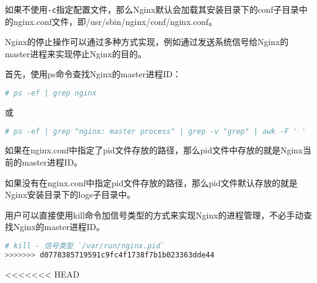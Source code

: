 如果不使用\texttt{-c}指定配置文件，那么Nginx默认会加载其安装目录下的conf子目录中的nginx.conf文件，即/usr/sbin/nginx/conf/nginx.conf。

Nginx的停止操作可以通过多种方式实现，例如通过发送系统信号给Nginx的master进程来实现停止Nginx的目的。

首先，使用ps命令查找Nginx的master进程ID：

\begin{lstlisting}[language=bash]
# ps -ef | grep nginx 
\end{lstlisting}

或


\begin{lstlisting}[language=bash]
# ps -ef | grep "nginx: master process" | grep -v "grep" | awk -F ' ' '{print $2}'
\end{lstlisting}



\begin{compactitem}
\item 如果在nginx.conf中指定了pid文件存放的路径，那么pid文件中存放的就是Nginx当前的master进程ID。

\item 如果没有在nginx.conf中指定pid文件存放的路径，那么pid文件默认存放的就是Nginx安装目录下的logs子目录中。
\end{compactitem}

用户可以直接使用kill命令加信号类型的方式来实现Nginx的进程管理，不必手动查找Nginx的master进程ID。

\begin{lstlisting}[language=bash]
# kill - 信号类型 `/var/run/nginx.pid`
>>>>>>> d0778385719591c9fc4f1738f7b1b023363dde44
\end{lstlisting}



<<<<<<< HEAD
\begin{lstlisting}[language=bash]

\end{lstlisting}








\begin{lstlisting}[language=bash]

\end{lstlisting}

















